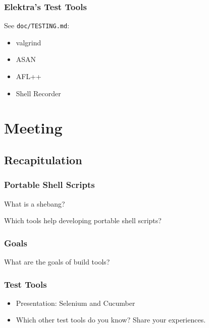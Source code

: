\begin{frame}[label=test tools]
	\frametitle{Elektra's Test Tools}

	See \texttt{doc/TESTING.md}:

	\begin{itemize}[<+-| alert@+>]
	\item valgrind
	\item ASAN
	\item AFL++
	\item Shell Recorder
	\end{itemize}
\end{frame}

\section{Meeting}

\subsection{Recapitulation}


\begin{frame}
	\frametitle{Portable Shell Scripts}

	What is a shebang?

	Which tools help developing portable shell scripts?
\end{frame}

\begin{frame}
	\frametitle{Goals}

	What are the goals of build tools?
\end{frame}


\begin{frame}
	\frametitle{Test Tools}

	\begin{itemize}[<+-| alert@+>]
	\item Presentation: Selenium and Cucumber
	\item Which other test tools do you know?
	Share your experiences.
	\end{itemize}
\end{frame}


\breakframe

